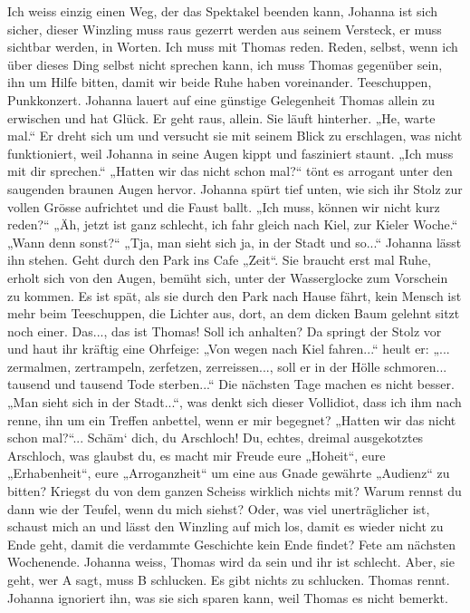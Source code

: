 Ich weiss einzig einen Weg, der das Spektakel beenden kann, Johanna ist sich sicher, dieser Winzling muss raus gezerrt werden aus seinem Versteck, er muss sichtbar werden, in Worten. Ich muss mit Thomas reden. Reden, selbst, wenn ich über dieses Ding selbst nicht sprechen kann, ich muss Thomas gegenüber sein, ihn um Hilfe bitten, damit wir beide Ruhe haben voreinander.
Teeschuppen, Punkkonzert. Johanna lauert auf eine günstige Gelegenheit Thomas allein zu erwischen und hat Glück. Er geht raus, allein. Sie läuft hinterher. „He, warte mal.“ Er dreht sich um und versucht sie mit seinem Blick zu erschlagen, was nicht funktioniert, weil Johanna in seine Augen kippt und fasziniert staunt. „Ich muss mit dir sprechen.“ „Hatten wir das nicht schon mal?“ tönt es arrogant unter den saugenden braunen Augen hervor. Johanna spürt tief unten, wie sich ihr Stolz zur vollen Grösse aufrichtet und die Faust ballt. „Ich muss, können wir nicht kurz reden?“ „Äh, jetzt ist ganz schlecht, ich fahr gleich nach Kiel, zur Kieler Woche.“ „Wann denn sonst?“ „Tja, man sieht sich ja, in der Stadt und so...“ Johanna lässt ihn stehen. Geht durch den Park ins Cafe „Zeit“. Sie braucht erst mal Ruhe, erholt sich von den Augen, bemüht sich, unter der Wasserglocke zum Vorschein zu kommen.
Es ist spät, als sie durch den Park nach Hause fährt, kein Mensch ist mehr beim Teeschuppen, die Lichter aus, dort, an dem dicken Baum gelehnt sitzt noch einer. Das..., das ist Thomas!  Soll ich anhalten? Da springt der Stolz vor und haut ihr kräftig eine Ohrfeige: „Von wegen nach Kiel fahren...“ heult er: „... zermalmen, zertrampeln, zerfetzen, zerreissen..., soll er in der Hölle schmoren... tausend und tausend Tode sterben...“
Die nächsten Tage machen es nicht besser. „Man sieht sich in der Stadt...“, was denkt sich dieser Vollidiot, dass ich ihm nach renne, ihn um ein Treffen anbettel, wenn er mir begegnet? „Hatten wir das nicht schon mal?“... Schäm` dich, du Arschloch! Du, echtes, dreimal ausgekotztes Arschloch, was glaubst du, es macht mir Freude eure „Hoheit“, eure „Erhabenheit“, eure „Arroganzheit“ um eine aus Gnade gewährte „Audienz“ zu bitten? Kriegst du von dem ganzen Scheiss wirklich nichts mit? Warum rennst du dann wie der Teufel, wenn du mich siehst? Oder, was viel unerträglicher ist, schaust mich an und lässt den Winzling auf mich los, damit es wieder nicht zu Ende geht, damit die verdammte Geschichte kein Ende findet?
Fete am nächsten Wochenende. Johanna weiss, Thomas wird da sein und ihr ist schlecht. Aber, sie geht, wer A sagt, muss B schlucken. Es gibt nichts zu schlucken. Thomas rennt. Johanna ignoriert ihn, was sie sich sparen kann, weil Thomas es nicht bemerkt.

